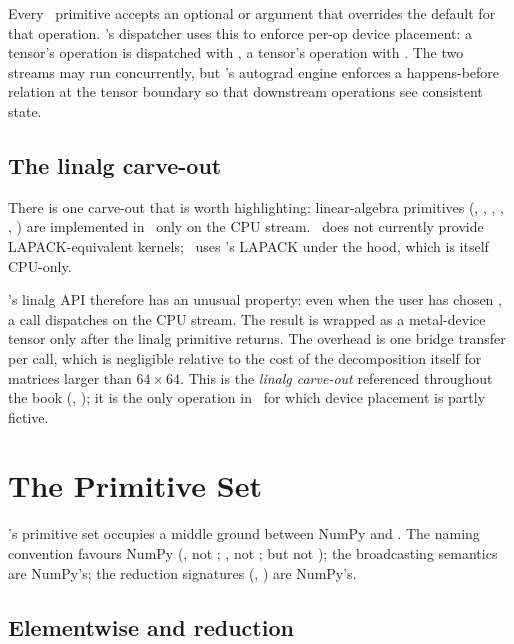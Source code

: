 Every \MLX\ primitive accepts an optional  or
 argument that overrides the default for that
operation. \Lucid's dispatcher uses this to enforce per-op device
placement: a  tensor's operation is dispatched with
, a  tensor's operation with
. The two streams may run concurrently, but
\Lucid's autograd engine enforces a happens-before relation at the
tensor boundary so that downstream operations see consistent state.

\subsection{The linalg carve-out}
\label{ssec:mlx_runtime:linalg_carveout}

There is one carve-out that is worth highlighting: linear-algebra
primitives (, , , ,
, ) are implemented in \MLX\ only on the CPU
stream. \Metal\ does not currently provide LAPACK-equivalent kernels;
\MLX\ uses \Accelerate's LAPACK under the hood, which is itself
CPU-only.

\Lucid's linalg API therefore has an unusual property: even when the
user has chosen , a 
call dispatches on the CPU stream. The result is wrapped as a
metal-device tensor only after the linalg primitive returns. The
overhead is one  bridge transfer per call, which
is negligible relative to the cost of the decomposition itself for
matrices larger than \(64 \times 64\). This is the \emph{linalg
carve-out} referenced throughout the book
(, ); it is the only
operation in \Lucid\ for which device placement is partly fictive.

\section{The Primitive Set}
\label{sec:mlx_runtime:primitives}

\MLX's primitive set occupies a middle ground between NumPy and
. The naming convention favours NumPy
(, not ; , not
;  but not ); the broadcasting
semantics are NumPy's; the reduction signatures
(, ) are NumPy's.

\subsection{Elementwise and reduction}
\label{ssec:mlx_runtime:elementwise}

